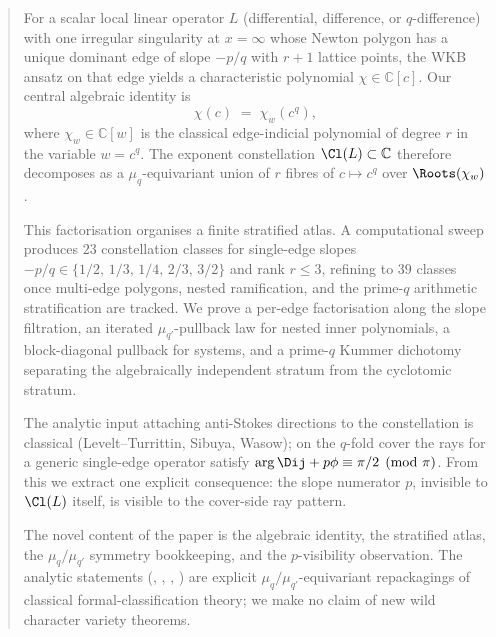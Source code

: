 \begin{abstract}
For a scalar local linear operator $L$ (differential, difference, or
$q$-difference) with one irregular singularity at $x = \infty$ whose
Newton polygon has a unique dominant edge of slope $-p/q$ with $r{+}1$
lattice points, the WKB ansatz on that edge yields a characteristic
polynomial $\chi \in \mathbb{C}[c]$. Our central algebraic identity is
\[
   \chi(c) \;=\; \chi_w(c^q),
\]
where $\chi_w \in \mathbb{C}[w]$ is the classical edge-indicial
polynomial of degree $r$ in the variable $w = c^q$. The exponent
constellation $\Cl(L) \subset \mathbb{C}$ therefore decomposes as a
$\mu_q$-equivariant union of $r$ fibres of $c \mapsto c^q$ over
$\Roots(\chi_w)$.

This factorisation organises a finite stratified atlas. A computational
sweep produces $23$ constellation classes for single-edge slopes
$-p/q \in \{1/2,\,1/3,\,1/4,\,2/3,\,3/2\}$ and rank $r \le 3$,
refining to $39$ classes once multi-edge polygons, nested ramification,
and the prime-$q$ arithmetic stratification are tracked. We prove a
per-edge factorisation along the slope filtration, an iterated
$\mu_{q'}$-pullback law for nested inner polynomials, a block-diagonal
pullback for systems, and a prime-$q$ Kummer dichotomy separating the
algebraically independent stratum from the cyclotomic stratum.

The analytic input attaching anti-Stokes directions to the constellation
is classical (Levelt--Turrittin, Sibuya, Wasow); on the $q$-fold cover
the rays for a generic single-edge operator satisfy $\arg \Dij + p\phi
\equiv \pi/2 \pmod{\pi}$. From this we extract one explicit consequence:
the slope numerator $p$, invisible to $\Cl(L)$ itself, is visible to
the cover-side ray pattern.

The novel content of the paper is the algebraic identity, the
stratified atlas, the $\mu_q/\mu_{q'}$ symmetry bookkeeping, and the
$p$-visibility observation. The analytic statements (,
, , ) are explicit
$\mu_q/\mu_{q'}$-equivariant repackagings of classical formal-classification
theory; we make no claim of new wild character variety theorems.
\end{abstract}
